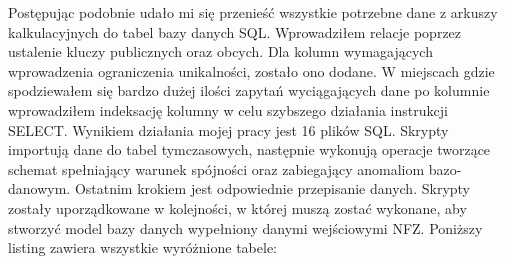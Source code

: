 Postępując podobnie udało mi się przenieść wszystkie potrzebne dane z arkuszy kalkulacyjnych do tabel bazy danych SQL. Wprowadziłem relacje poprzez ustalenie kluczy publicznych oraz obcych. Dla kolumn wymagających wprowadzenia ograniczenia unikalności, zostało ono dodane. W miejscach gdzie spodziewałem się bardzo dużej ilości zapytań wyciągających dane po kolumnie wprowadziłem indeksację kolumny w celu szybszego działania instrukcji SELECT.
Wynikiem działania mojej pracy jest 16 plików SQL. Skrypty importują dane do tabel tymczasowych, następnie wykonują operacje tworzące schemat spełniający warunek spójności oraz zabiegający anomaliom bazo-danowym. Ostatnim krokiem jest odpowiednie przepisanie danych. Skrypty zostały uporządkowane w kolejności, w której muszą zostać wykonane, aby stworzyć model bazy danych wypełniony danymi wejściowymi NFZ. Poniższy listing zawiera wszystkie wyróżnione tabele:

